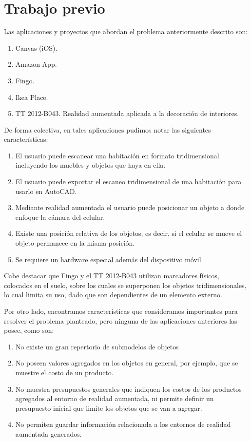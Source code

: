 \section{Trabajo previo}
Las aplicaciones y proyectos que abordan el problema anteriormente descrito son:

\begin{enumerate}
	\item Canvas (iOS).
	\item Amazon App.
	\item Fingo.
	\item Ikea Place.
	\item TT 2012-B043. Realidad aumentada aplicada a la decoración de interiores.
\end{enumerate}

De forma colectiva, en tales aplicaciones pudimos notar las siguientes características:

\begin{enumerate}
	\item El usuario puede escanear una habitación en formato tridimensional incluyendo los muebles y objetos que haya en ella.
	\item El usuario puede exportar el escaneo tridimensional de una habitación para usarlo en AutoCAD.
	\item Mediante realidad aumentada el usuario puede posicionar un objeto a donde enfoque la cámara del celular.
	\item Existe una posición relativa de los objetos, es decir, si el celular se mueve el objeto permanece en la misma posición.
	\item Se requiere un hardware especial además del dispositivo móvil.
\end{enumerate}

Cabe destacar que Fingo y el TT 2012-B043 utilizan marcadores físicos, colocados en el suelo, sobre los cuales se superponen los objetos tridimensionales, lo cual limita su uso, dado que son dependientes de un elemento externo.\par
Por otro lado, encontramos características que consideramos importantes para resolver el problema planteado, pero ninguna de las aplicaciones anteriores las posee, como son:


\begin{enumerate}
	\item No existe un gran repertorio de submodelos de objetos
	\item No poseen valores agregados en los objetos en general, por ejemplo, que se muestre el costo de un producto.
	\item No muestra presupuestos generales que indiquen los costos de los productos agregados al entorno de realidad aumentada, ni permite definir un presupuesto inicial que limite los objetos que se van a agregar.
	\item No permiten guardar información relacionada a los entornos de realidad aumentada generados.
\end{enumerate}

